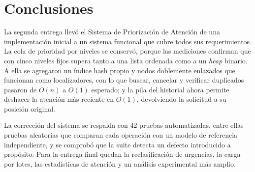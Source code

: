 \section{Conclusiones}
\label{sec:conclusiones}

La segunda entrega llevó el Sistema de Priorización de Atención de una
implementación inicial a un sistema funcional que cubre todos sus
requerimientos. La cola de prioridad por niveles se conservó, porque las
mediciones confirman que con cinco niveles fijos supera tanto a una lista
ordenada como a un \emph{heap} binario. A ella se agregaron un índice hash
propio y nodos doblemente enlazados que funcionan como localizadores, con
lo que buscar, cancelar y verificar duplicados pasaron de $O(n)$ a $O(1)$
esperado; y la pila del historial ahora permite deshacer la atención más
reciente en $O(1)$, devolviendo la solicitud a su posición original.

La corrección del sistema se respalda con 42 pruebas automatizadas, entre
ellas pruebas aleatorias que comparan cada operación con un modelo de
referencia independiente, y se comprobó que la suite detecta un defecto
introducido a propósito. Para la entrega final quedan la reclasificación
de urgencias, la carga por lotes, las estadísticas de atención y un
análisis experimental más amplio.
